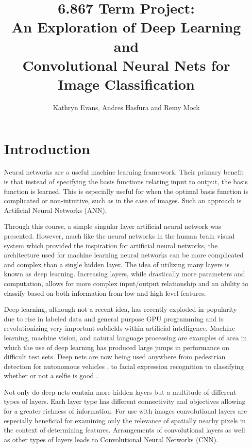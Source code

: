 \documentclass[12pt, twocolumn]{article}
\begin{document}
\title{ 6.867 Term Project: \\ An Exploration of Deep Learning and \\ Convolutional Neural Nets for Image Classification\\ }
 \author{Kathryn Evans, Andres Hasfura and Remy Mock}
\maketitle

\section{ Introduction} 
Neural networks are a useful machine learning framework. Their primary benefit is that instead of specifying the basis functions relating input to output, the basis function is learned.  This is especially useful for when the optimal basis function is complicated or non-intuitive, such as in the case of images.  Such an approach is Artificial Neural Networks (ANN). 


Through this course, a simple singular layer artificial neural network was presented. However, much like the neural networks in the human brain visual system which provided the inspiration for artificial neural networks, the architecture used for machine learning neural networks can be more complicated and complex than a single hidden layer. The idea of utilizing many layers is known as deep learning.  Increasing layers, while drastically more parameters and computation,  allows for more complex input/output relationship and an ability to classify based on both information from low and high level features.

Deep learning, although not a recent idea, has recently exploded in popularity due to rise in labeled data and general purpose GPU programming and is revolutionizing very important subfields within artificial intelligence. Machine learning, machine vision, and natural language processing are examples of area in which the use of deep learning has produced large jumps in performance on difficult test sets. Deep nets are now being used anywhere from pedestrian detection for autonomous vehicles \cite{Szarvas2006}, to facial expression recognition \cite{Li2015} to classifying whether or not a selfie is good \cite{Karpathy}. 
	
Not only do deep nets contain more hidden layers but a multitude of different types of layers. Each layer type has different connectivity and objectives allowing for a greater richness of information. For use with images convolutional layers are especially beneficial for examining only the relevance of spatially nearby pixels in the context of determining features. Arrangements of convolutional layers as well as other types of layers leads to Convolutional Neural Networks (CNN). 
\end{document}
